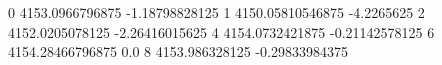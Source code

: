 0 4153.0966796875 -1.18798828125
1 4150.05810546875 -4.2265625
2 4152.0205078125 -2.26416015625
4 4154.0732421875 -0.21142578125
6 4154.28466796875 0.0
8 4153.986328125 -0.29833984375
